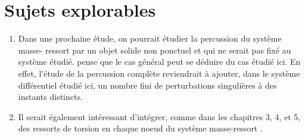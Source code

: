 \documentclass[
  french,
	11pt, %
]{fphw}
\begin{document}

\section{Sujets explorables}

\begin{enumerate}
  \item Dans une prochaine étude, on pourrait étudier la percussion du système masse-
  ressort par un objet solide non ponctuel et qui ne serait pas fixé au système étudié. \citeauthor{balasoiu2020halthesis} pense que le cas général peut se déduire du cas étudié ici. En effet, l’étude de la percussion complète reviendrait à ajouter, dans le système différentiel étudié ici, un nombre fini de perturbations singulières à des instants distincts. 
  \item Il serait également intéressant d’intégrer, comme dans les chapitres 3, 4, et 5, des ressorts de torsion en chaque noeud du système masse-ressort \parencite[p.187]{balasoiu2020halthesis}.
\end{enumerate}

\clearpage   %
\printbibliography
\end{document}
